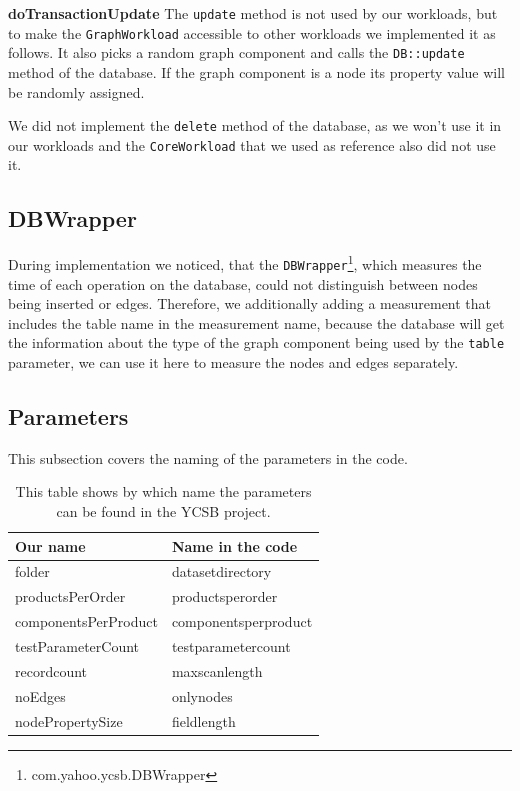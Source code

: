 \textbf{doTransactionUpdate} \newline
The \texttt{update} method is not used by our workloads,
but to make the \texttt{GraphWorkload} accessible to other workloads we implemented it as follows.
It also picks a random graph component and calls the \texttt{DB::update} method of the database.
If the graph component is a node its property value will be randomly assigned.

We did not implement the \texttt{delete} method of the database,
as we won't use it in our workloads and the \texttt{CoreWorkload} that we used as reference also did not use it.

\subsection{DBWrapper}
During implementation we noticed,
that the \texttt{DBWrapper}\footnote{com.yahoo.ycsb.DBWrapper},
which measures the time of each operation on the database,
could not distinguish between nodes being inserted or edges.
Therefore,
we additionally adding a measurement that includes the table name in the measurement name,
because the database will get the information about the type of the graph component being used by the \texttt{table} parameter,
we can use it here to measure the nodes and edges separately.

\subsection{Parameters}
This subsection covers the naming of the parameters in the code.

\begin{table}[h!]
  \begin{minipage}{\textwidth}
    \begin{tabularx}{\textwidth}{ | X | X | }
      \hline
      Our name & Name in the code \\ \hline \hline
      folder & datasetdirectory \\ \hline
      productsPerOrder & productsperorder \\ \hline
      componentsPerProduct & componentsperproduct \\ \hline
      testParameterCount & testparametercount \\ \hline
      recordcount & maxscanlength \\ \hline
      noEdges & onlynodes \\ \hline
      nodePropertySize & fieldlength \\ \hline
    \end{tabularx}
  \end{minipage}
  \caption{This table shows by which name the parameters can be found in the YCSB project.}
  \label{tab:parameterMapping}
\end{table}

